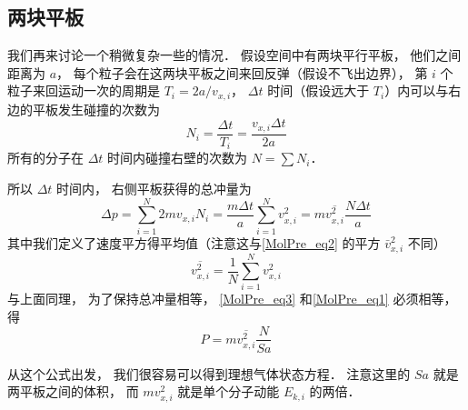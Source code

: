 \subsection{两块平板}
我们再来讨论一个稍微复杂一些的情况． 假设空间中有两块平行平板， 他们之间距离为 $a$， 每个粒子会在这两块平板之间来回反弹（假设不飞出边界）， 第 $i$ 个粒子来回运动一次的周期是 $T_i = 2a/v_{x,i}$， $\Delta t$ 时间（假设远大于 $T_i$）内可以与右边的平板发生碰撞的次数为
\begin{equation}
N_i = \frac{\Delta t}{T_i} = \frac{v_{x,i} \Delta t}{2a}
\end{equation}
所有的分子在 $\Delta t$ 时间内碰撞右壁的次数为 $N = \sum N_i$．

所以 $\Delta t$ 时间内， 右侧平板获得的总冲量为
\begin{equation}\label{MolPre_eq3}
\Delta p = \sum_{i=1}^N 2mv_{x,i} N_i = \frac{m \Delta t}{a} \sum_{i=1}^N v_{x,i}^2 = m\overline {v_{x,i}^2} \frac{ N\Delta t}{a}
\end{equation}
其中我们定义了速度平方得平均值（注意这与\autoref{MolPre_eq2} 的平方 $\bar v_{x,i}^2$ 不同）
\begin{equation}
\overline {v_{x,i}^2} = \frac{1}{N} \sum_{i=1}^N v_{x,i}^2
\end{equation}
与上面同理， 为了保持总冲量相等， \autoref{MolPre_eq3} 和\autoref{MolPre_eq1} 必须相等， 得
\begin{equation}\label{MolPre_eq4}
P = m \overline {v_{x,i}^2} \frac{N}{Sa}
\end{equation}

从这个公式出发， 我们很容易可以得到理想气体状态方程． 注意这里的 $Sa$ 就是两平板之间的体积， 而 $mv_{x,i}^2$ 就是单个分子动能 $E_{k,i}$ 的两倍．
